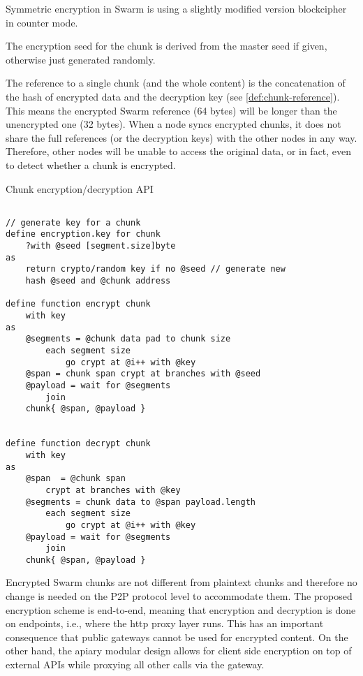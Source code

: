 
Symmetric encryption in Swarm is using a slightly modified version blockcipher in counter mode.

The encryption seed for the chunk is derived from the master seed if given, otherwise just generated randomly. 

The reference to a single chunk (and the whole content) is the concatenation of the hash of encrypted data and the decryption key (see \ref{def:chunk-reference}). This means the encrypted Swarm reference (64 bytes) will be longer than the unencrypted one (32 bytes). When a node syncs encrypted chunks, it does not share the full references (or the decryption keys) with the other nodes in any way.  Therefore, other nodes will be unable to access the original data, or in fact, even to detect whether a chunk is encrypted.

\begin{definition}{Chunk encryption/decryption API}\label{def:encrypt}
\begin{lstlisting}[language=buzz1]

// generate key for a chunk
define encryption.key for chunk
    ?with @seed [segment.size]byte
as
    return crypto/random key if no @seed // generate new 
    hash @seed and @chunk address

define function encrypt chunk
    with key 
as   
    @segments = @chunk data pad to chunk size
        each segment size 
            go crypt at @i++ with @key 
    @span = chunk span crypt at branches with @seed 
    @payload = wait for @segments 
        join
    chunk{ @span, @payload } 


define function decrypt chunk
    with key 
as       
    @span  = @chunk span 
        crypt at branches with @key 
    @segments = chunk data to @span payload.length
        each segment size 
            go crypt at @i++ with @key
    @payload = wait for @segments 
        join
    chunk{ @span, @payload } 

\end{lstlisting}
\end{definition} 
       
        
Encrypted Swarm chunks are not different from plaintext chunks and therefore no change is needed on the P2P protocol level to accommodate them. The proposed encryption scheme is end-to-end, meaning that encryption and decryption is done on endpoints, i.e., where the http proxy layer runs. This has an important consequence that public gateways cannot be used for encrypted content. On the other hand, the apiary modular design allows for client side encryption on top of external  APIs while proxying all other calls via the gateway.

